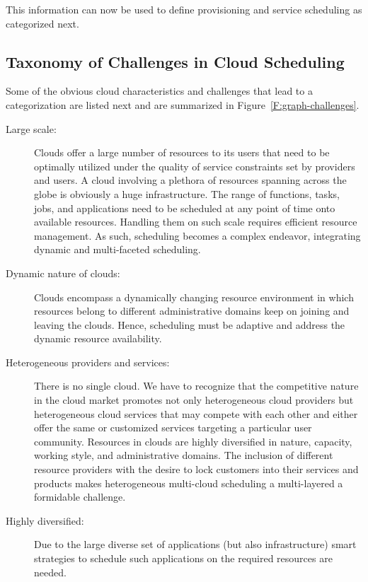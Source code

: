 \documentclass[final,5p,times,twocolumn]{elsarticle}
\begin{document}


This information can now be used to define provisioning and service scheduling as categorized next.

\subsection{Taxonomy of Challenges in Cloud Scheduling}\label{sec:challange}

Some of the obvious cloud characteristics and challenges that lead to a categorization are listed next and are summarized in Figure~\ref{F:graph-challenges}.

\begin{description}

\item [Large scale:] Clouds offer a large number of resources to its users that need to be optimally utilized under the quality of service constraints set by providers and users. A cloud involving a plethora of resources spanning across the globe is obviously a huge infrastructure. The range of functions, tasks, jobs, and applications need to be scheduled at any point of time onto available resources. Handling them on such scale requires efficient resource management. As such, scheduling becomes a complex endeavor, integrating dynamic and multi-faceted scheduling. 

\item [Dynamic nature of clouds:] Clouds encompass a dynamically changing resource environment in which resources belong to different administrative domains keep on joining and leaving the clouds. Hence, scheduling must be adaptive and address the dynamic resource availability.

\item[Heterogeneous providers and services:] There is no single cloud. We have to recognize that the competitive nature in the cloud market promotes not only heterogeneous cloud providers but heterogeneous cloud services that may compete with each other and either offer the same or customized services targeting a particular user community. Resources in clouds are highly diversified in nature, capacity, working style, and administrative domains. The inclusion of different resource providers with the desire to lock customers into their services and products makes heterogeneous multi-cloud scheduling a multi-layered a formidable challenge.

\item [Highly diversified:] Due to the large diverse set of applications (but also infrastructure) smart strategies to schedule such applications on the required resources are needed.


\end{description}
\end{document}
